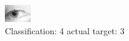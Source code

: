 \begin{figure}[h!]
\begin{center}
\includegraphics[width=0.60\columnwidth]{figures/ID1358_class_4_target_3.png}
\end{center}
\caption{ Classification: 4 actual target: 3}
\label{fig:ID1358_class_4_target_3}
\end{figure}
